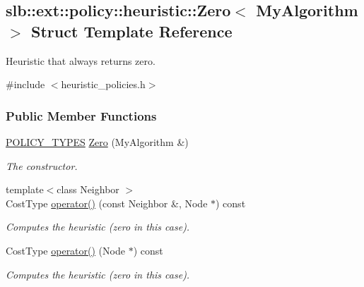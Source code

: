 \hypertarget{structslb_1_1ext_1_1policy_1_1heuristic_1_1Zero}{}\subsection{slb\+:\+:ext\+:\+:policy\+:\+:heuristic\+:\+:Zero$<$ My\+Algorithm $>$ Struct Template Reference}
\label{structslb_1_1ext_1_1policy_1_1heuristic_1_1Zero}


Heuristic that always returns zero.  




{\ttfamily \#include $<$heuristic\+\_\+policies.\+h$>$}

\subsubsection*{Public Member Functions}
\begin{DoxyCompactItemize}
\item 
\hyperlink{extensions_2shared__policies_2headers_8h_ae70a06fa4631780beea14971eb36a562}{P\+O\+L\+I\+C\+Y\+\_\+\+T\+Y\+P\+ES} \hyperlink{structslb_1_1ext_1_1policy_1_1heuristic_1_1Zero_a8439d8ce047f984201ba3f55f9a28ee0}{Zero} (My\+Algorithm \&)\hypertarget{structslb_1_1ext_1_1policy_1_1heuristic_1_1Zero_a8439d8ce047f984201ba3f55f9a28ee0}{}\label{structslb_1_1ext_1_1policy_1_1heuristic_1_1Zero_a8439d8ce047f984201ba3f55f9a28ee0}

\begin{DoxyCompactList}\small\item\em The constructor. \end{DoxyCompactList}\item 
{\footnotesize template$<$class Neighbor $>$ }\\Cost\+Type \hyperlink{structslb_1_1ext_1_1policy_1_1heuristic_1_1Zero_a8ae2cc4a0774d27ade5f13496f4672ba}{operator()} (const Neighbor \&, Node $\ast$) const 
\begin{DoxyCompactList}\small\item\em Computes the heuristic (zero in this case). \end{DoxyCompactList}\item 
Cost\+Type \hyperlink{structslb_1_1ext_1_1policy_1_1heuristic_1_1Zero_ac25cd5b9980135267181f3d2ab31390a}{operator()} (Node $\ast$) const 
\begin{DoxyCompactList}\small\item\em Computes the heuristic (zero in this case). \end{DoxyCompactList}\end{DoxyCompactItemize}


